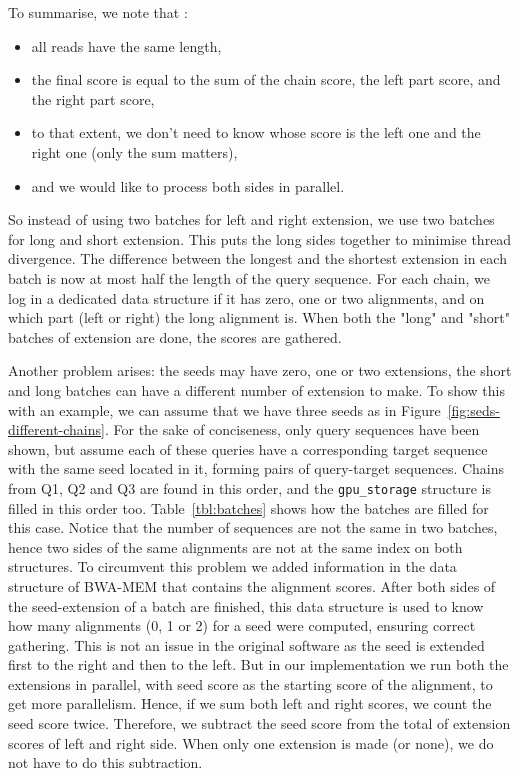 To summarise, we note that :
\begin{itemize}
	\item all reads have the same length,
	\item the final score is equal to the sum of the chain score, the left part score, and the right part score,
	\item to that extent, we don't need to know whose score is the left one and the right one (only the sum matters),
	\item and we would like to process both sides in parallel.
\end{itemize}

So instead of using two batches for left and right extension, we use two batches for long and short extension. This puts the long sides together to minimise thread divergence. The difference between the longest and the shortest extension in each batch is now at most half the length of the query sequence. For each chain, we log in a dedicated data structure if it has zero, one or two alignments, and on which part (left or right) the long alignment is. When both the "long" and "short" batches of extension are done, the scores are gathered.

Another problem arises: the seeds may have zero, one or two extensions, the short and long batches can have a different number of extension to make. To show this with an example, we can assume that we have three seeds as in Figure~\ref{fig:seds-different-chains}. For the sake of conciseness, only query sequences have been shown, but assume each of these queries have a corresponding target sequence with the same seed located in it, forming pairs of query-target sequences. Chains from Q1, Q2 and Q3 are found in this order, and the \verb|gpu_storage| structure is filled in this order too. Table~\ref{tbl:batches} shows how the batches are filled for this case. Notice that the number of sequences are not the same in two batches, hence two sides of the same alignments are not at the same index on both structures. To circumvent this problem we added information in the data structure of BWA-MEM that contains the alignment scores. After both sides of the seed-extension of a batch are finished, this data structure is used to know how many alignments (0, 1 or 2) for a seed were computed, ensuring correct gathering. This is not an issue in the original software as the seed is extended first to the right and then to the left. But in our implementation we run both the extensions in parallel, with seed score as the starting score of the alignment, to get more parallelism. Hence, if we sum both left and right scores, we count the seed score twice. Therefore, we subtract the seed score from the total of extension scores of left and right side. When only one extension is made (or none), we do not have to do this subtraction.

